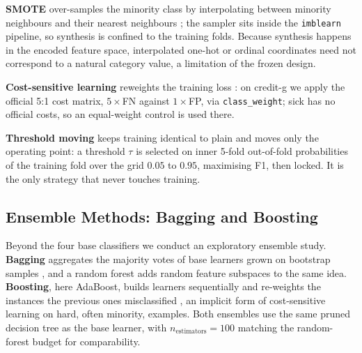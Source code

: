 \textbf{SMOTE} over-samples the minority class by interpolating
between minority neighbours and their nearest neighbours
\cite{chawla2002smote}; the sampler sits inside the \texttt{imblearn}
pipeline, so synthesis is confined to the training folds. Because
synthesis happens in the encoded feature space, interpolated one-hot
or ordinal coordinates need not correspond to a natural category
value, a limitation of the frozen design.

\textbf{Cost-sensitive learning} reweights the training loss
\cite{elkan2001foundations}: on credit-g we apply the official 5:1
cost matrix, $5\times$FN against $1\times$FP, via
\texttt{class\_weight}; sick has no official costs, so an
equal-weight control is used there.

\textbf{Threshold moving} keeps training identical to plain and moves
only the operating point: a threshold $\tau$ is selected on inner
5-fold out-of-fold probabilities of the training fold over the grid
$0.05$ to $0.95$, maximising F1, then locked. It is the only strategy
that never touches training.

\subsection{Ensemble Methods: Bagging and Boosting}
\label{ssec:ensemble-concepts}
Beyond the four base classifiers we conduct an exploratory ensemble
study. \textbf{Bagging} aggregates the majority votes of base
learners grown on bootstrap samples \cite{breiman1996bagging}, and a
random forest adds random feature subspaces to the same idea.
\textbf{Boosting}, here AdaBoost, builds learners sequentially and
re-weights the instances the previous ones misclassified
\cite{freund1997decision}, an implicit form of cost-sensitive learning
on hard, often minority, examples. Both ensembles use the same pruned
decision tree as the base learner, with $n_{\text{estimators}}=100$
matching the random-forest budget for comparability.
